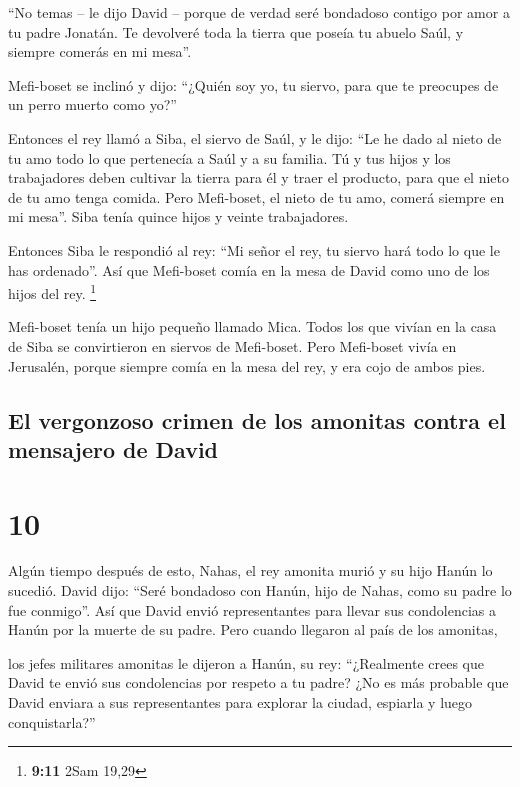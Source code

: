  ``No temas -- le dijo David -- porque de verdad seré
bondadoso contigo por amor a tu padre Jonatán. Te devolveré toda la
tierra que poseía tu abuelo Saúl, y siempre comerás en mi mesa''.

 Mefi-boset se inclinó y dijo: ``¿Quién soy yo, tu siervo,
para que te preocupes de un perro muerto como yo?''

 Entonces el rey llamó a Siba, el siervo de Saúl, y le
dijo: ``Le he dado al nieto de tu amo todo lo que pertenecía a Saúl y a
su familia.  Tú y tus hijos y los trabajadores deben
cultivar la tierra para él y traer el producto, para que el nieto de tu
amo tenga comida. Pero Mefi-boset, el nieto de tu amo, comerá siempre en
mi mesa''. Siba tenía quince hijos y veinte trabajadores.

 Entonces Siba le respondió al rey: ``Mi señor el rey, tu
siervo hará todo lo que le has ordenado''. Así que Mefi-boset comía en
la mesa de David como uno de los hijos del rey. \footnote{\textbf{9:11}
  2Sam 19,29}

 Mefi-boset tenía un hijo pequeño llamado Mica. Todos los
que vivían en la casa de Siba se convirtieron en siervos de Mefi-boset.
 Pero Mefi-boset vivía en Jerusalén, porque siempre comía
en la mesa del rey, y era cojo de ambos pies.

\hypertarget{el-vergonzoso-crimen-de-los-amonitas-contra-el-mensajero-de-david}{%
\subsection{El vergonzoso crimen de los amonitas contra el mensajero de
David}\label{el-vergonzoso-crimen-de-los-amonitas-contra-el-mensajero-de-david}}

\hypertarget{section-9}{%
\section{10}\label{section-9}}

 Algún tiempo después de esto, Nahas, el rey amonita murió
y su hijo Hanún lo sucedió.  David dijo: ``Seré bondadoso
con Hanún, hijo de Nahas, como su padre lo fue conmigo''. Así que David
envió representantes para llevar sus condolencias a Hanún por la muerte
de su padre. Pero cuando llegaron al país de los amonitas,

 los jefes militares amonitas le dijeron a Hanún, su rey:
``¿Realmente crees que David te envió sus condolencias por respeto a tu
padre? ¿No es más probable que David enviara a sus representantes para
explorar la ciudad, espiarla y luego conquistarla?''

